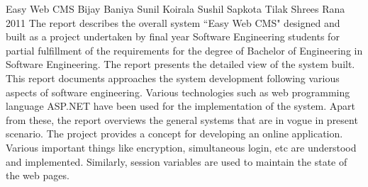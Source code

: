  \begin{conf-abstract}[]
{Easy Web CMS}
{
Bijay Baniya
Sunil Koirala
Sushil Sapkota
Tilak Shrees Rana
}
{2011}
	The report describes the overall system ``Easy Web CMS" designed and built as a project undertaken by  final year Software Engineering students for partial fulfillment of the requirements for the degree of Bachelor of Engineering in Software Engineering. The report presents the detailed view of the system built. This report documents approaches the system
development following various aspects of software engineering. Various technologies such as web programming language ASP.NET have been used for the implementation of the system. Apart from these, the report overviews the general systems that are in vogue in present scenario. The project provides a concept for developing an online application. Various important things
like encryption, simultaneous login, etc are understood and implemented. Similarly, session variables are used to maintain the state of the web pages.
  \end{conf-abstract}